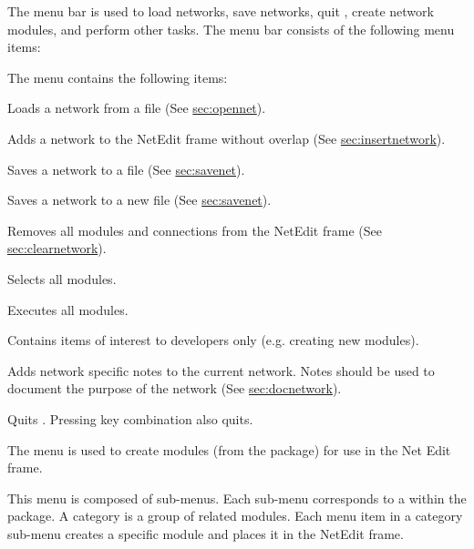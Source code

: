 \begin{description}
   The menu bar is used to load networks, save
  networks, quit \sr{}, create network modules, and perform other
  tasks.  The menu bar consists of the following menu items:

  \begin{description}
     The  menu contains the following items:

    \begin{description}
       Loads a network from a file (See
      \hyperref{this section}{Section~}{}{sec:opennet}).
      
       Adds a network to the NetEdit frame
      without overlap (See \hyperref{this
        section}{Section~}{}{sec:insertnetwork}).
      
       Saves a network to a file (See \hyperref{this
        section}{Section~}{}{sec:savenet}).

       Saves a network to a new file (See
      \hyperref{this section}{Section~}{}{sec:savenet}).
      
       Removes all modules and connections from
      the NetEdit frame (See \hyperref{this
        section}{Section~}{}{sec:clearnetwork}).

       Selects all modules.

       Executes all modules.
      
       Contains items of interest to
      developers only (e.g. creating new modules).
      
       Adds network specific
      notes to the current network.  Notes should be used to document
      the purpose of the network (See \hyperref{this
        section}{Section~}{}{sec:docnetwork}).
    
       Quits \sr{}.  Pressing key combination
       also quits.
    \end{description}
  \end{description}
  
  \begin{description}
     The  menu is used to create modules
    (from the \sr{} package) for use in the Net Edit frame.

    This menu is composed of sub-menus. Each sub-menu corresponds to
     a 
     within the \sr{} package.  A category is a group of
    related modules.  Each menu item in a category sub-menu creates a
    specific module and places it in the NetEdit frame.  
    

\end{description}
\end{description}
